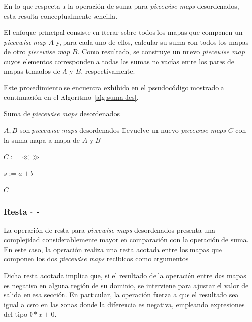 En lo que respecta a la operación de suma para \textit{piecewise maps} desordenados, esta resulta conceptualmente sencilla. 

El enfoque principal consiste en iterar sobre todos los mapas que componen un \textit{piecewise map} $A$ y, para cada uno de ellos, calcular su suma con todos los mapas de otro \textit{piecewise map} $B$. Como resultado, se construye un nuevo \textit{piecewise map} cuyos elementos corresponden a todas las sumas no vacías entre los pares de mapas tomados de $A$ y $B$, respectivamente.

Este procedimiento se encuentra exhibido en el pseudocódigo mostrado a continuación en el Algoritmo~\ref{alg:suma-des}.


\begin{algorithm}
\caption{Suma de \textit{piecewise maps}  desordenados}\label{alg:suma-des}
\begin{algorithmic}[1]
\Require $A,B$ son \textit{piecewise maps} desordenados  
\Ensure Devuelve un nuevo \textit{piecewise maps} $C$ con la suma mapa a mapa de $A$ y $B$  

  \State $C := \ll\gg$  

      \State $s := a + b$  
      \State {}
    \EndFor
  \EndFor

  \State \Return $C$
\EndFunction
\end{algorithmic}
\end{algorithm}




\subsubsection{Resta - \texttt{-}}

La operación de resta para \textit{piecewise maps} desordenados presenta una complejidad considerablemente mayor en comparación con la operación de suma. En este caso, la operación realiza una resta acotada entre los mapas que componen los dos \textit{piecewise maps} recibidos como argumentos.

Dicha resta acotada implica que, si el resultado de la operación entre dos mapas es negativo en alguna región de su dominio, se interviene para ajustar el valor de salida en esa sección. En particular, la operación fuerza a que el resultado sea igual a cero en las zonas donde la diferencia es negativa, empleando expresiones del tipo $0*x + 0$.

